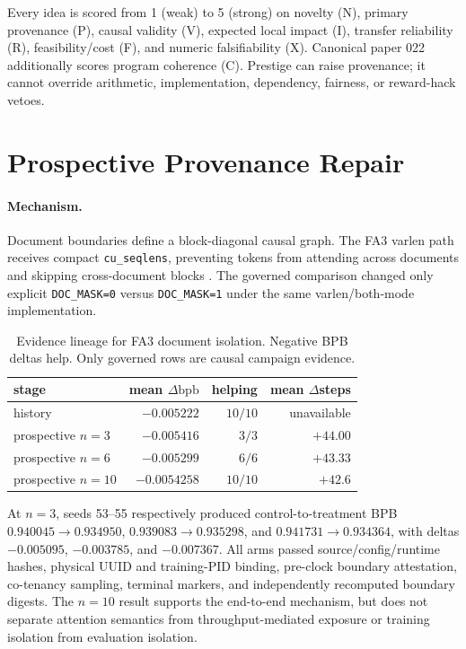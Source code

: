 \documentclass{article}
\newcommand{\bpb}{\mathrm{bpb}}
\begin{document}
Every idea is scored from 1 (weak) to 5 (strong) on novelty (N), primary
provenance (P), causal validity (V), expected local impact (I), transfer
reliability (R), feasibility/cost (F), and numeric falsifiability (X).
Canonical paper 022 additionally scores program coherence (C).  Prestige can
raise provenance; it cannot override arithmetic, implementation, dependency,
fairness, or reward-hack vetoes.

\section{Prospective Provenance Repair}

\paragraph{Mechanism.}
Document boundaries define a block-diagonal causal graph.  The FA3 varlen
path receives compact \texttt{cu\_seqlens}, preventing tokens from attending
across documents and skipping cross-document blocks \cite{dao2024fa3}.
The governed comparison changed only explicit \texttt{DOC\_MASK=0} versus
\texttt{DOC\_MASK=1} under the same varlen/both-mode implementation.

\begin{table}[t]
\caption{Evidence lineage for FA3 document isolation.  Negative BPB deltas
help.  Only governed rows are causal campaign evidence.}
\label{tab:docmask}
\centering\scriptsize
\begin{tabular}{lrrr}
\toprule
stage & mean $\Delta\bpb$ & helping & mean $\Delta$steps\\
\midrule
history & $-0.005222$ & $10/10$ & unavailable\\
prospective $n=3$ & $-0.005416$ & $3/3$ & $+44.00$\\
prospective $n=6$ & $-0.005299$ & $6/6$ & $+43.33$\\
prospective $n=10$ & $-0.0054258$ & $10/10$ & $+42.6$\\
\bottomrule
\end{tabular}
\end{table}

At $n=3$, seeds 53--55 respectively produced control-to-treatment BPB
$0.940045\!\rightarrow\!0.934950$,
$0.939083\!\rightarrow\!0.935298$, and
$0.941731\!\rightarrow\!0.934364$, with deltas $-0.005095$,
$-0.003785$, and $-0.007367$.  All arms passed source/config/runtime hashes,
physical UUID and training-PID binding, pre-clock boundary attestation,
co-tenancy sampling, terminal markers, and independently recomputed boundary
digests.  The $n=10$ result supports the end-to-end mechanism, but does not
separate attention semantics from throughput-mediated exposure or training
isolation from evaluation isolation.
\end{document}
